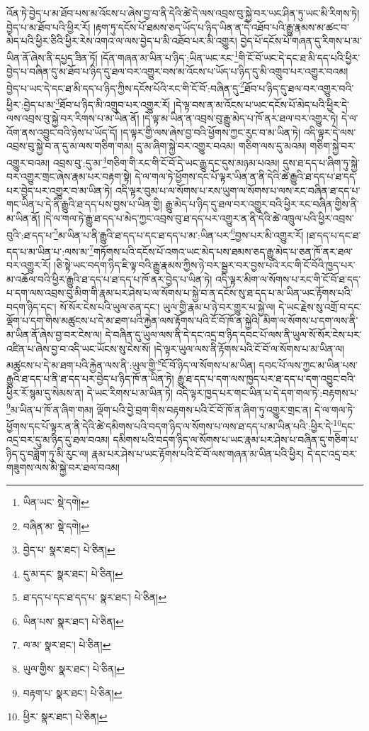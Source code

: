 འོན་ཏེ་བྱེད་པ་མ་ཐོབ་པས་མ་འོངས་པ་ཞེས་བྱ་བ་ནི་དེའི་ཚེ་དེ་ལས་འབྲས་བུ་སྐྱེ་བར་ཡང་ཤིན་ཏུ་ཡང་མི་རིགས་ཏེ། བྱེད་པ་མ་ཐོབ་པའི་ཕྱིར་རོ། །རྟག་ཏུ་དངོས་པོ་ཐམས་ཅད་ཡོད་པ་ཉིད་ཡིན་ན་དེ་འཐོབ་པའི་རྒྱུ་རྣམས་མ་ཚང་བ་མེད་པའི་ཕྱིར་ཅིའི་ཕྱིར་རེས་འགའ་ལ་ལས་བྱེད་པ་མི་འཐོབ་པར་མི་འགྱུར། བྱེད་པོ་དངོས་པོ་གཞན་དུ་རིགས་པ་མ་ཡིན་ནོ་ཞེས་ནི་དཔྱད་ཟིན་ཏོ། །དོན་གཞན་མ་ཡིན་པ་ཉིད་:ཡིན་ཡང་རང་\footnote{ཡིན་ཡང་  སྡེ་དགེ། }གི་ངོ་བོ་ཡང་དེ་དང་ཐ་མི་དད་པའི་ཕྱིར་བྱེད་པ་བཞིན་དུ་མ་ཐོབ་པ་ཉིད་དུ་ཐལ་བར་འགྱུར་བས་མ་འོངས་པ་ཡོད་པ་ཉིད་དུ་མི་འགྲུབ་པར་འགྱུར་བའམ། བྱེད་པ་ཡང་དེ་དང་ཐ་མི་དད་པ་ཉིད་ཀྱིས་དངོས་པོའི་རང་གི་ངོ་བོ་:བཞིན་དུ་\footnote{བཞིན་མ་  སྡེ་དགེ། }ཐོབ་པ་ཉིད་དུ་ཐལ་བར་འགྱུར་བའི་ཕྱིར་:བྱེད་པ་མ་\footnote{བྱེད་པ་  སྣར་ཐང་།  པེ་ཅིན། }ཐོབ་པ་ཉིད་མི་འགྲུབ་པར་འགྱུར་རོ། །དེ་ལྟ་བས་ན་མ་འོངས་པ་ཡང་དངོས་པོ་མེད་པའི་ཕྱིར་དེ་ལས་འབྲས་བུ་སྐྱེ་བར་རིགས་པ་མ་ཡིན་ནོ། །དེ་ལྟ་མ་ཡིན་ན་འབྲས་བུ་རྒྱུ་མེད་པ་ཁོ་ནར་ཐལ་བར་འགྱུར་ཏེ། དེ་ལ་འོག་ནས་འབྱུང་བའི་ཉེས་པ་ཡོད་དོ། །ད་ལྟར་གྱི་ལས་ཞེས་བྱ་བའི་ཕྱོགས་ཀྱང་རུང་བ་མ་ཡིན་ཏེ། འདི་ལྟར་དེ་ལས་འབྲས་བུ་སྐྱེ་བ་ན་དུ་མ་ལས་གཅིག་གམ། དུ་མ་ཞིག་སྐྱེ་བར་འགྱུར་བའམ། གཅིག་ལས་དུ་མའམ། གཅིག་སྐྱེ་བར་འགྱུར་བའམ། འབྲས་བུ་:དུ་མ་\footnote{དུ་མ་དང་  སྣར་ཐང་།  པེ་ཅིན། }གཅིག་གི་རང་གི་ངོ་བོ་དེ་ཡང་རྒྱུ་དང་དུས་མཉམ་པའམ། དུས་ཐ་དད་པ་ཞིག་ཏུ་སྐྱེ་བར་འགྱུར་གྲང་ཞེས་རྣམ་པར་བརྟག་སྟེ། དེ་ལ་གལ་ཏེ་ཕྱོགས་དང་པོ་ལྟར་ཡིན་ན་ནི་དེའི་ཚེ་རྒྱུའི་ཐ་དད་པ་ཐ་དད་པར་བྱེད་པར་འགྱུར་བ་མ་ཡིན་ཏེ། འདི་ལྟར་བུམ་པ་ལ་སོགས་པ་རས་ཡུག་ལ་སོགས་པ་ལས་རང་བཞིན་ཐ་དད་པ་གང་ཡིན་པ་དེ་ནི་རྒྱུའི་ཐ་དད་པས་བྱས་པ་ཡིན་གྱི། རྒྱུ་མེད་པ་ཉིད་དུ་ཐལ་བར་འགྱུར་བའི་ཕྱིར་རང་བཞིན་གྱིས་ནི་མ་ཡིན་ནོ། །དེ་ལ་གལ་ཏེ་རྒྱུ་ཐ་དད་པ་མེད་ཀྱང་འབྲས་བུ་ཐ་དད་པར་འགྱུར་ན་ནི་དེའི་ཚེ་འཁྲུལ་པའི་ཕྱིར་འབྲས་བུའི་:ཐ་དད་པ་\footnote{ཐ་དད་པ་དང་ཐ་དད་པ་  སྣར་ཐང་།  པེ་ཅིན། }མ་ཡིན་པ་ནི་རྒྱུའི་ཐ་དད་པ་དང་ཐ་དད་པ་མ་:ཡིན་པར་\footnote{ཡིན་པས་  སྣར་ཐང་།  པེ་ཅིན། }བྱས་པར་མི་འགྱུར་རོ། །ཐ་དད་པ་དང་ཐ་དད་པ་མ་ཡིན་པ་:ལས་མ་\footnote{ལ་མ་  སྣར་ཐང་།  པེ་ཅིན། }གཏོགས་པའི་དངོས་པོ་འགའ་ཡང་མེད་པས་ཐམས་ཅད་རྒྱུ་མེད་པ་ཅན་ཁོ་ནར་ཐལ་བར་འགྱུར་རོ། །ཅི་སྟེ་ཡང་བདག་ཉིད་ཇི་ལྟ་བའི་རྒྱུ་རྣམས་ཀྱིས་ཉེ་བར་སྦྱར་བར་བྱས་པའི་རང་གི་ངོ་བོའི་ཁྱད་པར་མ་འཆོལ་བའི་ཕྱིར་རྒྱུའི་ཐ་དད་པ་ཐ་དད་པ་ཁོ་ནར་བྱེད་པ་ཡིན་ཏེ། འདི་ལྟར་མིག་ལ་སོགས་པ་རང་གི་ངོ་བོ་ཐ་དད་པ་དག་ལས་འབྲས་བུ་མིག་གི་རྣམ་པར་ཤེས་པ་ལ་སོགས་པ་སྐྱེ་བ་ན་དངོས་སུ་ཐ་དད་པ་མ་ཡིན་ཡང་རྟོགས་པའི་བདག་ཉིད་དང་། སོ་སོར་ངེས་པའི་ཡུལ་ཅན་དང་། ཡུལ་གྱི་རྣམ་པ་ཉེ་བར་གྱུར་པ་སྐྱེ་ལ། དེ་ཡང་རྗེས་སུ་འགྲོ་བ་དང་ལྡོག་པ་དག་གིས་མཚུངས་པ་དེ་མ་ཐག་པའི་རྐྱེན་ལས་རྟོགས་པའི་ངོ་བོ་ཁོ་ན་སྐྱེའི། མིག་ལ་སོགས་པ་དག་ལས་ནི་མ་ཡིན་ནོ་ཞེས་བྱ་བར་ངེས་ལ། དེ་བཞིན་དུ་ཡུལ་ལས་ནི་དེ་དང་འདྲ་བ་ཉིད་དབང་པོ་ལས་ནི་ཡུལ་སོ་སོར་ངེས་པར་འཛིན་པ་ཞེས་བྱ་བ་འདི་ཡང་ཡོངས་སུ་ངེས་སོ། །དེ་ལྟར་ཡུལ་ལས་ནི་རྟོགས་པའི་ངོ་བོ་ལ་སོགས་པ་མ་ཡིན་ལ། མཚུངས་པ་དེ་མ་ཐག་པའི་རྐྱེན་ལས་ནི་:ཡུལ་གྱི་\footnote{ཡུལ་གྱིས་  སྣར་ཐང་།  པེ་ཅིན། }ངོ་བོ་ཉིད་ལ་སོགས་པ་མ་ཡིན། དབང་པོ་ལས་ཀྱང་མ་ཡིན་པས་རྒྱུའི་ཐ་དད་པ་ནི་ཐ་དད་པར་བྱེད་པ་ཉིད་ཁོ་ན་ཡིན་ཏེ། རྒྱུ་ཐ་དད་པ་དག་ལས་ཁྱད་པར་ཐ་དད་པ་དག་འབྱུང་བའི་ཕྱིར་རོ་སྙམ་དུ་སེམས་ན། དེ་ཡང་རིགས་པ་མ་ཡིན་ཏེ། འདི་ལྟར་ཁྱད་པར་གང་ཡིན་པ་དེ་དག་གལ་ཏེ་:བརྟགས་པ་\footnote{བརྟག་པ་  སྣར་ཐང་།  པེ་ཅིན། }མ་ཡིན་པ་ཁོ་ན་ཞིག་གམ། ལྡོག་པའི་བྱེ་བྲག་གིས་བརྟགས་པའི་ངོ་བོ་ཁོ་ན་ཞིག་ཏུ་འགྱུར་གྲང་ན། དེ་ལ་གལ་ཏེ་ཕྱོགས་དང་པོ་ལྟར་ན་ནི་དེའི་ཚེ་དམིགས་པའི་བདག་ཉིད་ལ་སོགས་པ་ལས་ཐ་དད་པ་མ་ཡིན་པའི་:ཕྱིར་དེ་\footnote{ཕྱིར་  སྣར་ཐང་།  པེ་ཅིན། }དང་འདྲ་བར་དུ་མ་ཉིད་དུ་ཐལ་བའམ། དམིགས་པའི་བདག་ཉིད་ལ་སོགས་པ་ཡང་རྣམ་པར་ཤེས་པ་བཞིན་དུ་གཅིག་པ་ཉིད་དུ་བཟློག་ཏུ་མི་རུང་ལ། རྣམ་པར་ཤེས་པ་ཡང་རྟོགས་པའི་ངོ་བོ་ལས་གཞན་མ་ཡིན་པའི་ཕྱིར། དེ་དང་འདྲ་བར་གཟུགས་ལས་མི་སྐྱེ་བར་ཐལ་བའམ། 
